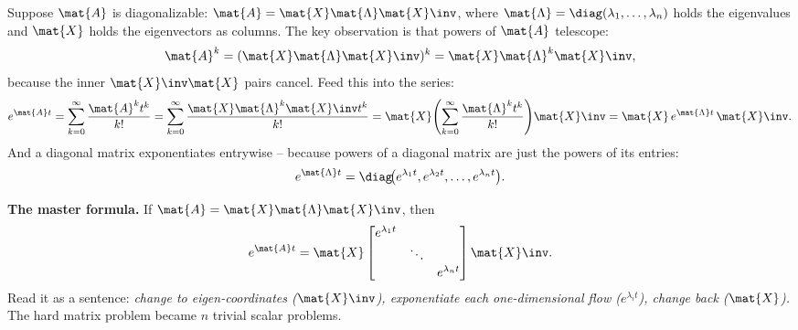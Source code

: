Suppose $\mat{A}$ is diagonalizable: $\mat{A} = \mat{X}\mat{\Lambda}\mat{X}\inv$,
where $\mat{\Lambda} = \diag(\lambda_1,\dots,\lambda_n)$ holds the eigenvalues and
$\mat{X}$ holds the eigenvectors as columns. The key observation is that powers
of $\mat{A}$ telescope:
\[
  \mat{A}^k
  = (\mat{X}\mat{\Lambda}\mat{X}\inv)^k
  = \mat{X}\mat{\Lambda}^k\mat{X}\inv,
\]
because the inner $\mat{X}\inv\mat{X}$ pairs cancel. Feed this into the series:
\[
  e^{\mat{A}t}
  = \sum_{k=0}^\infty \frac{\mat{A}^k t^k}{k!}
  = \sum_{k=0}^\infty \frac{\mat{X}\mat{\Lambda}^k\mat{X}\inv t^k}{k!}
  = \mat{X}\!\left(\sum_{k=0}^\infty \frac{\mat{\Lambda}^k t^k}{k!}\right)\!\mat{X}\inv
  = \mat{X}\, e^{\mat{\Lambda}t}\,\mat{X}\inv.
\]
And a diagonal matrix exponentiates entrywise -- because powers of a diagonal
matrix are just the powers of its entries:
\[
  e^{\mat{\Lambda}t}
  = \diag\!\bigl(e^{\lambda_1 t}, e^{\lambda_2 t}, \dots, e^{\lambda_n t}\bigr).
\]

\begin{focusbox}
\textbf{The master formula.} If $\mat{A}=\mat{X}\mat{\Lambda}\mat{X}\inv$, then
\[
  e^{\mat{A}t}
  = \mat{X}
    \begin{bmatrix}
      e^{\lambda_1 t} & & \\
      & \ddots & \\
      & & e^{\lambda_n t}
    \end{bmatrix}
    \mat{X}\inv.
\]
Read it as a sentence: \emph{change to eigen-coordinates ($\mat{X}\inv$),
exponentiate each one-dimensional flow ($e^{\lambda_i t}$), change back
($\mat{X}$).} The hard matrix problem became $n$ trivial scalar problems.
\end{focusbox}

